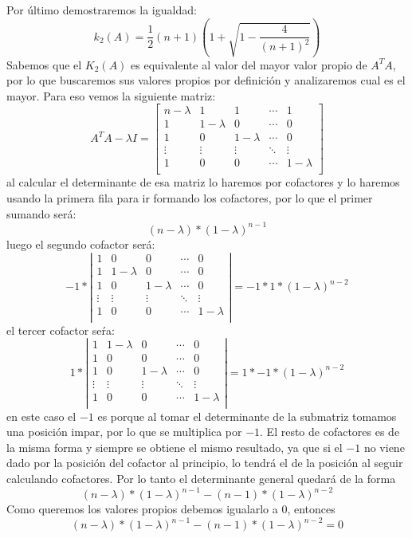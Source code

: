 \documentclass{article}
\begin{document}
Por último demostraremos la igualdad:
$$ k_2(A) = \frac{1}{2}(n+1)\left(1+\sqrt{1-\frac{4}{(n+1)^{2}}}\right)$$
Sabemos que el $K_2(A)$ es equivalente al valor del mayor valor propio de $A^{T}A$, por lo que buscaremos sus valores propios por definición y analizaremos cual es el mayor. Para eso vemos la siguiente matriz:
$$A^{T}A-\lambda I = 
\begin{bmatrix}
n-\lambda&1&1&\cdots&1\\
1&1-\lambda&0&\cdots&0\\
1&0&1-\lambda&\cdots&0\\
\vdots&\vdots&\vdots&\ddots&\vdots\\
1&0&0&\cdots&1-\lambda\\
\end{bmatrix}
$$
al calcular el determinante de esa matriz lo haremos por cofactores y lo haremos usando la primera fila para ir formando los cofactores, por lo que el primer sumando será:
$$(n-\lambda)*(1-\lambda)^{n-1}$$
luego
el segundo cofactor será:
$$ -1*\left|\begin{matrix}
1&0&0&\cdots&0\\
1&1-\lambda&0&\cdots&0\\
1&0&1-\lambda&\cdots&0\\
\vdots&\vdots&\vdots&\ddots&\vdots\\
1&0&0&\cdots&1-\lambda\\
\end{matrix}\right|
=
-1*1*(1-\lambda)^{n-2}$$
el tercer cofactor seŕa:
$$ 1*\left|\begin{matrix}
1&1-\lambda&0&\cdots&0\\
1&0&0&\cdots&0\\
1&0&1-\lambda&\cdots&0\\
\vdots&\vdots&\vdots&\ddots&\vdots\\
1&0&0&\cdots&1-\lambda\\
\end{matrix}\right|
=
1*-1*(1-\lambda)^{n-2}$$
en este caso el $-1$ es porque al tomar el determinante de la submatriz tomamos una posición impar, por lo que se multiplica por $-1$.  El resto de cofactores es de la misma forma y siempre se obtiene el mismo resultado, ya que si el $-1$ no viene dado por la posición del cofactor al principio, lo tendrá el de la posición al seguir calculando cofactores.  Por lo tanto el determinante general quedará de la forma
$$(n-\lambda)*(1-\lambda)^{n-1}-(n-1)*(1-\lambda)^{n-2}$$
Como queremos los valores propios debemos igualarlo a $0$, entonces
$$(n-\lambda)*(1-\lambda)^{n-1}-(n-1)*(1-\lambda)^{n-2}=0$$
\end{document}
